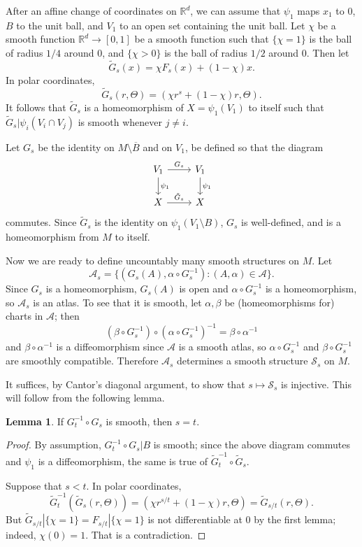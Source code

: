 \documentclass[10pt]{article}
\newcommand{\RR}{\mathbb{R}}
\theoremstyle{definition}
\newtheorem{lemma}{Lemma}[exer]
\begin{document}
After an affine change of coordinates on $\RR^d$, we can assume that $\psi_1$ maps $x_1$ to $0$, $B$ to the unit ball, and $V_1$ to an open set containing the unit ball.
Let $\chi$ be a smooth function $\RR^d \to [0, 1]$ be a smooth function such that $\{\chi = 1\}$ is the ball of radius $1/4$ around $0$, and $\{\chi > 0\}$ is the ball of radius $1/2$ around $0$.
Then let
$$\tilde G_s(x) = \chi F_s(x) + (1 - \chi)x.$$
In polar coordinates,
$$\tilde G_s(r, \Theta) = (\chi r^s + (1-\chi)r, \Theta).$$
It follows that $\tilde G_s$ is a homeomorphism of $X = \psi_1(V_1)$ to itself such that $\tilde G_s|\psi_i(V_i \cap V_j)$ is smooth whenever $j \neq i$.

Let $G_s$ be the identity on $M \setminus \overline B$ and on $V_1$, be defined so that the diagram
$$\begin{tikzcd}
V_1 \arrow[r,"G_s"] \arrow[d,"\psi_1"] & V_1 \arrow[d,"\psi_1"]\\
X \arrow[r,"\tilde G_s"] & X
\end{tikzcd}$$
commutes. Since $\tilde G_s$ is the identity on $\psi_1(V_1 \setminus B)$, $G_s$ is well-defined, and is a homeomorphism from $M$ to itself.

Now we are ready to define uncountably many smooth structures on $M$.
Let
$$\mathcal A_s = \{(G_s(A), \alpha \circ G_s^{-1}): (A, \alpha) \in \mathcal A\}.$$
Since $G_s$ is a homeomorphism, $G_s(A)$ is open and $\alpha \circ G_s^{-1}$ is a homeomorphism, so $\mathcal A_s$ is an atlas.
To see that it is smooth, let $\alpha, \beta$ be (homeomorphisms for) charts in $\mathcal A$; then
$$(\beta \circ G_s^{-1}) \circ (\alpha \circ G_s^{-1})^{-1} = \beta \circ \alpha^{-1}$$
and $\beta \circ \alpha^{-1}$ is a diffeomorphism since $\mathcal A$ is a smooth atlas, so $\alpha \circ G_s^{-1}$ and $\beta \circ G_s^{-1}$ are smoothly compatible.
Therefore $\mathcal A_s$ determines a smooth structure $\mathcal S_s$ on $M$.

It suffices, by Cantor's diagonal argument, to show that $s \mapsto \mathcal S_s$ is injective.
This will follow from the following lemma.

\begin{lemma}
If $G_t^{-1} \circ G_s$ is smooth, then $s = t$.
\end{lemma}
\begin{proof}
By assumption, $G_t^{-1} \circ G_s|B$ is smooth; since the above diagram commutes and $\psi_1$ is a diffeomorphism, the same is true of $\tilde G_t^{-1} \circ \tilde G_s$.

Suppose that $s < t$.
In polar coordinates,
$$\tilde G_t^{-1}(\tilde G_s(r, \Theta)) = (\chi r^{s/t} + (1-\chi) r, \Theta) = \tilde G_{s/t}(r, \Theta).$$
But $\tilde G_{s/t}|\{\chi = 1\} = F_{s/t}|\{\chi = 1\}$ is not differentiable at $0$ by the first lemma; indeed, $\chi(0) = 1$.
That is a contradiction.
\end{proof}
\end{document}
